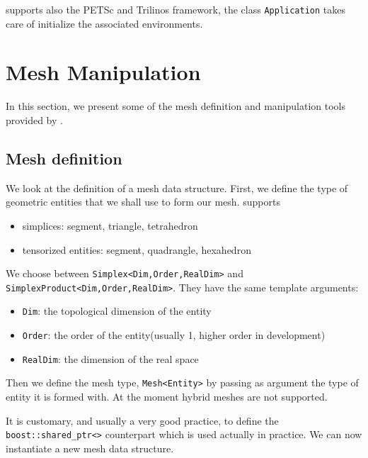 
\feel supports also the PETSc and Trilinos framework, the class
\lstinline!Application! takes care of
initialize the associated environments.

\section{Mesh Manipulation}
\label{sec:mesh-manipulation}

In this section, we present some of the mesh definition and
manipulation tools provided by \feel.

\subsection{Mesh definition}

We look at the definition of a mesh data structure. First, we define
the type of geometric entities that we shall use to form our mesh. \feel supports
\begin{itemize}
\item simplices: segment, triangle, tetrahedron
\item tensorized entities: segment, quadrangle, hexahedron
\end{itemize}

We choose between \lstinline!Simplex<Dim,Order,RealDim>!  and
\lstinline!SimplexProduct<Dim,Order,RealDim>!. They have the same
template arguments:
\begin{itemize}
\item \lstinline!Dim!: the topological dimension of the entity
\item \lstinline!Order!: the order of the entity(usually 1, higher order in development)
\item \lstinline!RealDim!: the dimension of the real space
\end{itemize}




Then we define the mesh type, \lstinline!Mesh<Entity>! by passing as
argument the type of entity it is formed with. At the moment hybrid
meshes are not supported.



It is customary, and usually a very good practice, to define the
\lstinline!boost::shared_ptr<>!  counterpart which is used actually in
practice. We can now instantiate a new mesh data structure.

